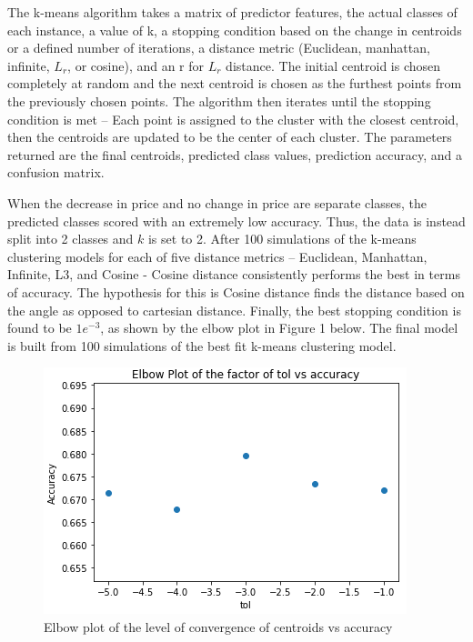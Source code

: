\documentclass[sigconf]{acmart}
\begin{document}
The k-means algorithm takes a matrix of predictor features, the actual classes of each instance, a value of k, a stopping condition based on the change in centroids or a defined number of iterations, a distance metric (Euclidean, manhattan, infinite, \(L_r\), or cosine), and an r for \(L_r\) distance. The initial centroid is chosen completely at random and the next centroid is chosen as the furthest points from the previously chosen points. The algorithm then iterates until the stopping condition is met – Each point is assigned to the cluster with the closest centroid, then the centroids are updated to be the center of each cluster. The parameters returned are the final centroids, predicted class values, prediction accuracy, and a confusion matrix.

When the decrease in price and no change in price are separate classes, the predicted classes scored with an extremely low accuracy. Thus, the data is instead split into 2 classes and \( k \) is set to 2. After 100 simulations of the k-means clustering models for each of five distance metrics – Euclidean, Manhattan, Infinite, L3, and Cosine - Cosine distance consistently performs the best in terms of accuracy. The hypothesis for this is Cosine distance finds the distance based on the angle as opposed to cartesian distance. Finally, the best stopping condition is found to be \( 1e^{-3} \), as shown by the elbow plot in Figure 1 below. The final model is built from 100 simulations of the best fit k-means clustering model.

\begin{figure}[h]
\centering
\includegraphics[width=\linewidth]{K_Means_Elbow}
\caption{Elbow plot of the level of convergence of centroids vs accuracy}
\end{figure}
\end{document}
